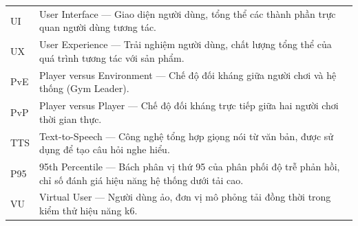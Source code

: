 \begin{longtable}{p{3.2cm} p{10.8cm}}
\hline
UI      & User Interface — Giao diện người dùng, tổng thể các thành phần trực quan người dùng tương tác. \\
UX      & User Experience — Trải nghiệm người dùng, chất lượng tổng thể của quá trình tương tác với sản phẩm. \\

\hline
PvE     & Player versus Environment — Chế độ đối kháng giữa người chơi và hệ thống (Gym Leader). \\
PvP     & Player versus Player — Chế độ đối kháng trực tiếp giữa hai người chơi thời gian thực. \\
TTS     & Text-to-Speech — Công nghệ tổng hợp giọng nói từ văn bản, được sử dụng để tạo câu hỏi nghe hiểu. \\

\hline
P95     & 95th Percentile — Bách phân vị thứ 95 của phân phối độ trễ phản hồi, chỉ số đánh giá hiệu năng hệ thống dưới tải cao. \\
VU      & Virtual User — Người dùng ảo, đơn vị mô phỏng tải đồng thời trong kiểm thử hiệu năng k6. \\

\end{longtable}
